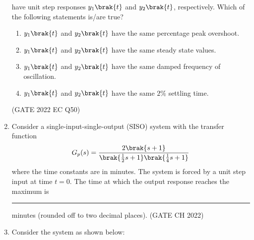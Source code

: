 \begin{enumerate}[label=\thechapter.\arabic*,ref=\thechapter.\theenumi]
    have unit step responses $y_{1}\brak{t}$ and $y_{2}\brak{t}$, respectively. Which of the following statements is/are true?
    \begin{enumerate}
    \item $y_{1}\brak{t}$ and $y_{2}\brak{t}$ have the same percentage peak overshoot.\\
    \item $y_{1}\brak{t}$ and $y_{2}\brak{t}$ have the same steady state values.\\
    \item $y_{1}\brak{t}$ and $y_{2}\brak{t}$ have the same damped frequency of oscillation.\\
    \item $y_{1}\brak{t}$ and $y_{2}\brak{t}$ have the same $2\%$ settling time.\\
    \end{enumerate}
    \hfill(GATE 2022 EC Q50)\\
    \solution
    
    \newpage
\item Consider a single-input-single-output (SISO) system with the transfer function
\begin{align*}
G_p(s) = \frac{2\brak{s+1}}{\brak{\frac{1}{2}s+1}\brak{\frac{1}{4}s+1}}
\end{align*}
where the time constants are in minutes. The system is forced by a unit step input at
time $t = 0$. The time at which the output response reaches the maximum is \rule{1cm}{0.15mm} minutes (rounded off to two decimal places). \hfill (GATE CH 2022)\\
\solution

\newpage
\item Consider the system as shown below:



\end{enumerate}
